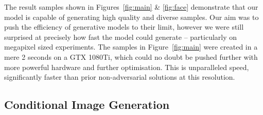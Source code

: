 The result samples shown in Figures~\ref{fig:main} \& \ref{fig:face} demonstrate
that our model is capable of generating high quality and diverse samples. Our
aim was to push the efficiency of generative models to their limit, however we
were still surprised at precisely how fast the model could generate --
particularly on megapixel sized experiments. The samples in
Figure~\ref{fig:main} were created in a mere 2 seconds on a GTX 1080Ti, which
could no doubt be pushed further with more powerful hardware and further
optimisation. This is unparalleled speed, significantly faster than prior
non-adversarial solutions at this resolution.

\subsection{Conditional Image Generation}
\label{subsec:evaluationConditional}

